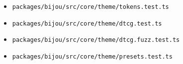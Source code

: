 \begin{itemize}
\tightlist
\item
  \texttt{p\allowbreak{}a\allowbreak{}c\allowbreak{}k\allowbreak{}a\allowbreak{}g\allowbreak{}e\allowbreak{}s\allowbreak{}/\allowbreak{}b\allowbreak{}i\allowbreak{}j\allowbreak{}o\allowbreak{}u\allowbreak{}/\allowbreak{}s\allowbreak{}r\allowbreak{}c\allowbreak{}/\allowbreak{}c\allowbreak{}o\allowbreak{}r\allowbreak{}e\allowbreak{}/\allowbreak{}t\allowbreak{}h\allowbreak{}e\allowbreak{}m\allowbreak{}e\allowbreak{}/\allowbreak{}t\allowbreak{}o\allowbreak{}k\allowbreak{}e\allowbreak{}n\allowbreak{}s\allowbreak{}.\allowbreak{}t\allowbreak{}e\allowbreak{}s\allowbreak{}t\allowbreak{}.\allowbreak{}t\allowbreak{}s}
\item
  \texttt{p\allowbreak{}a\allowbreak{}c\allowbreak{}k\allowbreak{}a\allowbreak{}g\allowbreak{}e\allowbreak{}s\allowbreak{}/\allowbreak{}b\allowbreak{}i\allowbreak{}j\allowbreak{}o\allowbreak{}u\allowbreak{}/\allowbreak{}s\allowbreak{}r\allowbreak{}c\allowbreak{}/\allowbreak{}c\allowbreak{}o\allowbreak{}r\allowbreak{}e\allowbreak{}/\allowbreak{}t\allowbreak{}h\allowbreak{}e\allowbreak{}m\allowbreak{}e\allowbreak{}/\allowbreak{}d\allowbreak{}t\allowbreak{}c\allowbreak{}g\allowbreak{}.\allowbreak{}t\allowbreak{}e\allowbreak{}s\allowbreak{}t\allowbreak{}.\allowbreak{}t\allowbreak{}s}
\item
  \texttt{p\allowbreak{}a\allowbreak{}c\allowbreak{}k\allowbreak{}a\allowbreak{}g\allowbreak{}e\allowbreak{}s\allowbreak{}/\allowbreak{}b\allowbreak{}i\allowbreak{}j\allowbreak{}o\allowbreak{}u\allowbreak{}/\allowbreak{}s\allowbreak{}r\allowbreak{}c\allowbreak{}/\allowbreak{}c\allowbreak{}o\allowbreak{}r\allowbreak{}e\allowbreak{}/\allowbreak{}t\allowbreak{}h\allowbreak{}e\allowbreak{}m\allowbreak{}e\allowbreak{}/\allowbreak{}d\allowbreak{}t\allowbreak{}c\allowbreak{}g\allowbreak{}.\allowbreak{}f\allowbreak{}u\allowbreak{}z\allowbreak{}z\allowbreak{}.\allowbreak{}t\allowbreak{}e\allowbreak{}s\allowbreak{}t\allowbreak{}.\allowbreak{}t\allowbreak{}s}
\item
  \texttt{p\allowbreak{}a\allowbreak{}c\allowbreak{}k\allowbreak{}a\allowbreak{}g\allowbreak{}e\allowbreak{}s\allowbreak{}/\allowbreak{}b\allowbreak{}i\allowbreak{}j\allowbreak{}o\allowbreak{}u\allowbreak{}/\allowbreak{}s\allowbreak{}r\allowbreak{}c\allowbreak{}/\allowbreak{}c\allowbreak{}o\allowbreak{}r\allowbreak{}e\allowbreak{}/\allowbreak{}t\allowbreak{}h\allowbreak{}e\allowbreak{}m\allowbreak{}e\allowbreak{}/\allowbreak{}p\allowbreak{}r\allowbreak{}e\allowbreak{}s\allowbreak{}e\allowbreak{}t\allowbreak{}s\allowbreak{}.\allowbreak{}t\allowbreak{}e\allowbreak{}s\allowbreak{}t\allowbreak{}.\allowbreak{}t\allowbreak{}s}

\end{itemize}
